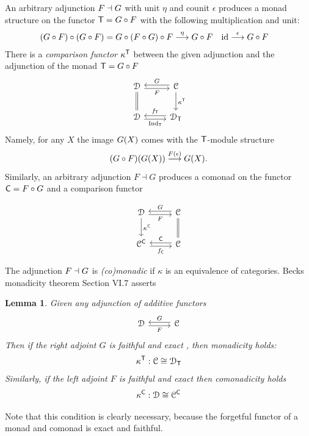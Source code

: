 \documentclass[a4paper, reqno]{amsart}
\newtheorem{lemma}[theorem]{Lemma}
\theoremstyle{introTheorems}
\newcommand\id{\textup{id}}
\renewcommand{\1}{\mathbbold{1}}
\begin{document}
 An arbitrary adjunction $F\dashv {G}$ with unit $\eta$ and counit $\epsilon$
 produces a monad structure on the functor ${\mathsf{T}}={G}\circ F$ with the following multiplication and unit:
\begin{align*}
(\Fra\circ F)\circ(\Fra\circ F) 
=\Fra\circ (F\circ \Fra)\circ F
&\stackrel{\eta}{\longrightarrow} \Fra\circ F 
&%
\id
&\stackrel{\epsilon}{\longrightarrow}
\Fra\circ F 
\end{align*}
There is a \emph{comparison functor} $\kappa^{\mathsf{T}}$ between the given adjunction and the adjunction of the monad ${\mathsf{T}}={G}\circ F$
 \[\begin{tikzcd}[row sep=5ex, column sep=6ex]
\catD
\arrow[r,swap, shift right=2pt,"F"]
\arrow[d,equal]& 
\arrow[l,swap, shift right=2pt,"\Fra"] 
\catC
\arrow[d,"\kappa^\monT"]
\\
\catD
\arrow[r, leftarrow, shift right=-2pt,"\forget_\monT"]
\arrow[r, rightarrow, swap,shift right=2pt,"\funT"]
& 
\catD_\monT
\end{tikzcd}\]
Namely, for any $X$ the image ${G}(X)$ comes with  the ${\mathsf{T}}$-module structure 
$$({G}\circ F)({G}(X))\stackrel{F(\epsilon)}{\longrightarrow} {G}(X).$$
Similarly, an arbitrary adjunction $F\dashv G$ produces a comonad on the functor $\mathsf{C}=F\circ G$ and a comparison functor

 \[\begin{tikzcd}[row sep=5ex, column sep=6ex]
\catD
\arrow[r,swap, shift right=2pt,"F"]
\arrow[d,"\kappa^\comonC"]& 
\arrow[l,swap, shift right=2pt,"\Fra"] 
\catC
\arrow[d,equal]
\\
\catC^\comonC
\arrow[r, rightarrow, swap, shift right=2pt,"\forget_\comonC"]
\arrow[r, leftarrow,shift right=-2pt,"\comonC"]
& 
\catC
\end{tikzcd}\]



The adjunction $F\dashv{G}$ is \emph{(co)monadic} if $\kappa$ is an equivalence of categories. Becks monadicity theorem \cite{MacL52} Section VI.7 asserts 

\begin{lemma}
    Given any adjunction of additive functors
    \[\begin{tikzcd}[row sep=5ex, column sep=6ex]
    \catD\arrow[r,swap, shift right=2pt,"F"] & \arrow[l,swap, shift right=2pt,"\Fra"] \catC
    \end{tikzcd}\]
    Then if the right adjoint $G$ is faithful and exact , then monadicity holds:
    $$\kappa^{\mathsf{T}}: \mathcal{C} \cong \mathcal{D}_{\mathsf{T}}$$
    Similarly, if the left adjoint $F$ is 
    faithful and exact then comonadicity holds
    $$\kappa^{\mathsf{C}}: \mathcal{D} \cong \mathcal{C}^{\mathsf{C}}$$
\end{lemma}
Note that this condition is clearly necessary, because the forgetful functor of a monad and comonad is exact and faithful.
\end{document}
